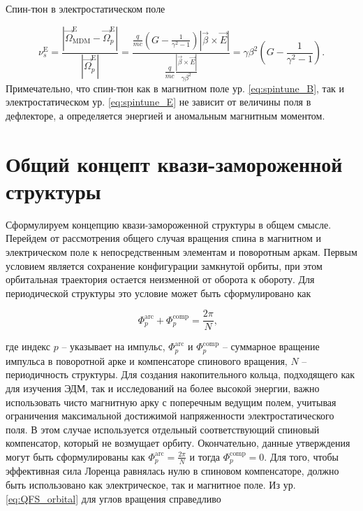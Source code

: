\noindent Спин-тюн в электростатическом поле

\begin{equation} 
\nu_s^{\textrm{E}}=\frac{\left|{\vec{\Omega}}_{\textrm{MDM}}^{\textrm{E}}-{\vec{\Omega}}_p^{\textrm{E}}\right|}{\left|{\vec{\Omega}}_p^{\textrm{E}}\right|}=\frac{\frac{q}{mc}\left(G-\frac{1}{\gamma^2-1}\right)\left|\vec{\beta}\times\vec{E}\right|}{\frac{q}{mc}\frac{\left|\vec{\beta}\times\vec{E}\right|}{\gamma\beta^2}}=\gamma\beta^2\left(G-\frac{1}{\gamma^2-1}\right).
\label{eq:spintune_E}
\end{equation}
Примечательно, что спин-тюн как в магнитном поле ур. \ref{eq:spintune_B}, так и  электростатическом ур. \ref{eq:spintune_E} не зависит от величины поля в дефлекторе, а определяется энергией и аномальным магнитным моментом.

\section{Общий концепт квази-замороженной структуры}\label{sec:EDM/requirements/deflector}

\par Сформулируем концепцию квази-замороженной структуры в общем смысле. Перейдем от рассмотрения общего случая вращения спина в магнитном и электрическом поле к непосредственным элементам и поворотным аркам. Первым условием является сохранение конфигурации замкнутой орбиты, при этом орбитальная траектория остается неизменной от оборота к обороту. Для периодической структуры это условие может быть сформулировано как 

\begin{equation}
	\Phi_p^{\textrm{arc}}+\Phi_{p}^{\textrm{comp}}=\frac{2\pi}{N},\ \ \
	\label{eq:QFS_orbital}
\end{equation}

\noindent где индекс $p$ -- указывает на импульс, $\Phi_p^{\textrm{arc}}$ и $\Phi_{p}^{\textrm{comp}}$ -- суммарное вращение импульса в поворотной арке и компенсаторе спинового вращения, $N$ -- периодичность структуры. Для создания накопительного кольца, подходящего как для изучения ЭДМ, так и исследований на более высокой энергии, важно использовать чисто магнитную арку с поперечным ведущим полем, учитывая ограничения максимальной достижимой напряженности электростатического поля. В этом случае используется отдельный соответствующий спиновый компенсатор, который не возмущает орбиту. Окончательно, данные утверждения могут быть сформулированы как $\Phi_p^{\textrm{arc}} = \frac{2\pi}{N}$ и тогда $\Phi_{p}^{\textrm{comp}} = 0$. Для того, чтобы эффективная сила Лоренца равнялась нулю в спиновом компенсаторе, должно быть использовано как электрическое, так и магнитное поле. Из ур. \ref{eq:QFS_orbital} для углов вращения справедливо

